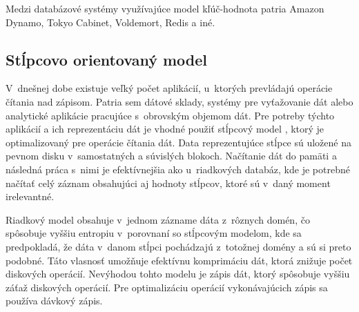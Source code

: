 \documentclass[11pt,twoside,a4paper]{book}
\begin{document}
Medzi databázové systémy využívajúce model kľúč-hodnota patria Amazon Dynamo, Tokyo Cabinet, Voldemort, Redis a iné.

\subsection{Stĺpcovo orientovaný model}


V~dnešnej dobe existuje veľký počet aplikácií, u~ktorých prevládajú operácie čítania nad zápisom. Patria sem dátové sklady, systémy pre vyťažovanie dát alebo analytické aplikácie pracujúce s~obrovským objemom dát. Pre potreby týchto aplikácií a ich reprezentáciu dát je vhodné použiť stĺpcový model \cite{abadi2009column, abadi2009}, ktorý je optimalizovaný pre operácie čítania dát. Data reprezentujúce stĺpce sú uložené na pevnom disku v~samostatných a súvislých blokoch. Načítanie dát do pamäti a následná práca s~nimi je efektívnejšia ako u~riadkových databáz, kde je potrebné načítať celý záznam obsahujúci aj hodnoty stĺpcov, ktoré sú v~daný moment irelevantné.

Riadkový model obsahuje v~jednom zázname dáta z~rôznych domén, čo spôsobuje vyššiu entropiu v~porovnaní so stĺpcovým modelom, kde sa predpokladá, že dáta v~danom stĺpci pochádzajú z~totožnej domény a sú si preto podobné. Táto vlasnosť umožňuje efektívnu komprimáciu dát, ktorá znižuje počet diskových operácií. Nevýhodou tohto modelu je zápis dát, ktorý spôsobuje vyššiu záťaž diskových operácií. Pre optimalizáciu operácií vykonávajúcich zápis sa používa dávkový zápis.

\end{document}
